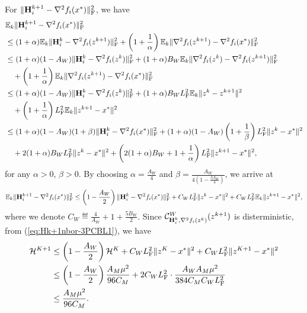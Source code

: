 \documentclass[11pt]{article}
\begin{document}
	
	For $\|\mathbf{H}_i^{k+1} - \nabla^2 f_i(x^*)\|_{\rm F}^2$, we have 
	\begin{align*}
		& \mathbb{E}_k \|\mathbf{H}_i^{k+1} - \nabla^2 f_i(x^*)\|_{\rm F}^2 \\
		& \leq (1 + \alpha) \mathbb{E}_k \|\mathbf{H}_i^k - \nabla^2 f_i (z^{k+1}) \|_{\rm F}^2 + \left(  1 + \frac{1}{\alpha}  \right) \mathbb{E}_k \| \nabla^2 f_i(z^{k+1}) - \nabla^2 f_i(x^*)\|_{\rm F}^2 \\ 
		& \leq (1+\alpha) (1-A_W) \|\mathbf{H}_i^k - \nabla^2 f_i(z^k)\|_{\rm F}^2 + (1+\alpha)B_W \mathbb{E}_k\|\nabla^2 f_i(z^k) - \nabla^2 f_i(z^{k+1})\|_{\rm F}^2 \\ 
		& \quad + \left(  1 + \frac{1}{\alpha}  \right) \mathbb{E}_k \| \nabla^2 f_i(z^{k+1}) - \nabla^2 f_i(x^*)\|_{\rm F}^2 \\ 
		& \leq (1+\alpha) (1-A_W) \|\mathbf{H}_i^k - \nabla^2 f_i(z^k)\|_{\rm F}^2 + (1+\alpha) B_WL_{\rm F}^2 \mathbb{E}_k\|z^k-z^{k+1}\|^2 \\ 
		& \quad +  \left(  1 + \frac{1}{\alpha}  \right) L_{\rm F}^2 \mathbb{E}_k \|z^{k+1}-x^*\|^2 \\ 
		& \leq (1+\alpha) (1-A_W) (1+\beta) \|\mathbf{H}_i^k - \nabla^2 f_i(x^*)\|_{\rm F}^2 + (1+\alpha) (1-A_W) \left(  1 + \frac{1}{\beta}  \right) L_{\rm F}^2 \|z^k-x^*\|^2 \\ 
		& \quad + 2(1+\alpha) B_WL_{\rm F}^2 \|z^k-x^*\|^2 + \left(  2(1+\alpha) B_W + 1 + \frac{1}{\alpha}  \right) L_{\rm F}^2 \|z^{k+1}-x^*\|^2, 
	\end{align*}
	for any $\alpha>0$, $\beta>0$. By choosing $\alpha = \frac{A_W}{4}$ and $\beta = \frac{A_W}{4(1-\frac{3A_W}{4})}$, we arrive at 
	\begin{equation}\label{eq:Hk+1nbor-3PCBL1}
		\mathbb{E}_k \|\mathbf{H}_i^{k+1} - \nabla^2 f_i(x^*)\|_{\rm F}^2 \leq \left(  1 - \frac{A_W}{2}  \right) \|\mathbf{H}_i^k - \nabla^2 f_i(x^*)\|_{\rm F}^2 + C_W L_{\rm F}^2 \|z^k-x^*\|^2 + C_W L_{\rm F}^2 \mathbb{E}_k\|z^{k+1}-x^*\|^2, 
	\end{equation}
	where we denote $C_W \eqdef \frac{4}{A_W} + 1 + \frac{5B_W}{2}$. Since ${\mathcal{C}}^W_{\mathbf{H}_i^k, \nabla^2 f_i(z^k)} (z^{k+1})$ is disterministic, from (\ref{eq:Hk+1nbor-3PCBL1}), we have 
	\begin{align*}
		{\cal H}^{K+1} & \leq \left(  1 - \frac{A_W}{2}  \right) {\cal H}^K + C_WL_{\rm F}^2 \|z^K-x^*\|^2 + C_WL_{\rm F}^2 \|z^{K+1}-x^*\|^2 \\ 
		& \leq \left(  1 - \frac{A_W}{2}  \right) \frac{A_M \mu^2}{96C_M} + 2C_WL_{\rm F}^2 \cdot \frac{A_WA_M \mu^2}{384C_MC_WL_{\rm F}^2}  \\ 
		& \leq \frac{A_M \mu^2}{96C_M}. 
	\end{align*}
	
\end{document}
